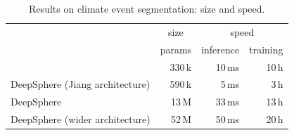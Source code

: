 \documentclass{article} %
\newcommand{\todo}[1]{{\color[rgb]{.6,.1,.6}{#1}}}
\begin{document}
\begin{table}
	\centering
	\begin{tabular}{l r r r}
		\toprule
		& \multicolumn{1}{c}{size} & \multicolumn{2}{c}{speed} \\
        \cmidrule(lr){2-2} \cmidrule(lr){3-4}
		& params & inference & training \\
		\midrule
		\citet{jiang2019sphericalcnn} & 330\,k & 10\,ms & 10\,h \\ %
		DeepSphere (Jiang architecture) & 590\,k & 5\,ms & 3\,h \\ %
        DeepSphere & 13\,M & 33\,ms & 13\,h \\ %
		DeepSphere (wider architecture) & 52\,M & 50\,ms & 20\,h \\
		\bottomrule
    \end{tabular}
    \caption{
		Results on climate event segmentation: size and speed.
	}
		\label{tab:climate:speed}
\end{table}
\pagebreak
\end{document}
